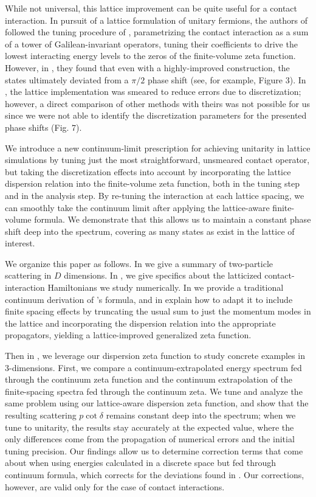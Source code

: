 While not universal, this lattice improvement can be quite useful for a contact interaction.
In pursuit of a lattice formulation of unitary fermions, the authors of  followed the tuning procedure of , parametrizing the contact interaction as a sum of a tower of Galilean-invariant operators, tuning their coefficients to drive the lowest interacting energy levels to the zeros of the \Luscher finite-volume zeta function.
However, in , they found that even with a highly-improved construction, the states ultimately deviated from a $\pi/2$ phase shift (see, for example, Figure 3).
In , the lattice implementation was smeared to reduce errors due to discretization; however, a direct comparison of other methods with theirs was not possible for us since we were not able to identify the discretization parameters for the presented phase shifts (Fig. 7).

We introduce a new continuum-limit prescription for achieving unitarity in lattice simulations by tuning just the most straightforward, unsmeared contact operator, but taking the discretization effects into account by incorporating the lattice dispersion relation into the finite-volume zeta function, both in the tuning step and in the analysis step.
By re-tuning the interaction at each lattice spacing, we can smoothly take the continuum limit after applying the lattice-aware finite-volume formula.
We demonstrate that this allows us to maintain a constant phase shift deep into the spectrum, covering as many \Aoneg states as exist in the lattice of interest.

We organize this paper as follows.  In  we give a summary of two-particle scattering in $D$ dimensions.
In , we give specifics about the latticized contact-interaction Hamiltonians we study numerically.
In  we provide a traditional continuum derivation of \Luscher's formula, and in  explain how to adapt it to include finite spacing effects by truncating the usual sum to just the momentum modes in the lattice and incorporating the dispersion relation into the appropriate propagators, yielding a lattice-improved generalized \Luscher zeta function.

Then in , we leverage our dispersion zeta function to study concrete examples in 3-dimensions.
First, we compare a continuum-extrapolated energy spectrum fed through the continuum zeta function and the continuum extrapolation of the finite-spacing spectra fed through the continuum zeta.
We tune and analyze the same problem using our lattice-aware dispersion zeta function, and show that the resulting scattering $p\cot\delta$ remains constant deep into the spectrum; when we tune to unitarity, the results stay accurately at the expected value, where the only differences come from the propagation of numerical errors and the initial tuning precision.  Our findings allow us to determine correction terms that come about when using energies calculated in a discrete space but fed through continuum \Luscher formula, which %
corrects for the deviations found in .  Our corrections, however, are valid only for the case of contact interactions.

